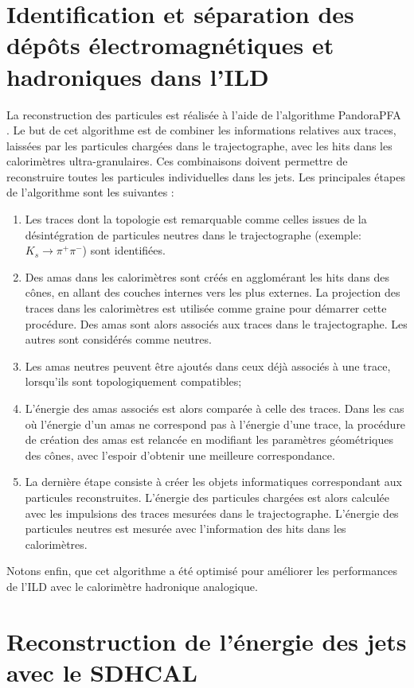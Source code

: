 \newpage
\section{Identification et séparation des dépôts électromagnétiques et hadroniques dans l'ILD}
\label{sec.pandora}
La reconstruction des particules est réalisée à l'aide de l'algorithme PandoraPFA \cite{pfaPandora}. Le but de cet algorithme est de combiner les informations relatives aux traces, laissées par les particules chargées dans le trajectographe, avec les hits dans les calorimètres ultra-granulaires. Ces combinaisons doivent permettre de reconstruire toutes les particules individuelles dans les jets. Les principales étapes de l'algorithme sont les suivantes \cite{pfaPandora}:
\begin{enumerate}[~~1-]
\item Les traces dont la topologie est remarquable comme celles issues de la désintégration de particules neutres dans le trajectographe (exemple: $K_s\rightarrow \pi^+\pi^-$) sont identifiées.
\item Des amas dans les calorimètres sont créés en agglomérant les hits dans des cônes, en allant des couches internes vers les plus externes. La projection des traces dans les calorimètres est utilisée comme graine pour démarrer cette procédure. Des amas sont alors associés aux traces dans le trajectographe. Les autres sont considérés comme neutres.
\item Les amas neutres peuvent être ajoutés dans ceux déjà associés à une trace, lorsqu'ils sont topologiquement compatibles;
\item L'énergie des amas associés est alors comparée à celle des traces. Dans les cas où l'énergie d'un amas ne correspond pas à l'énergie d'une trace, la procédure de création des amas est relancée en modifiant les paramètres géométriques des cônes, avec l'espoir d'obtenir une meilleure correspondance. 
\item La dernière étape consiste à créer les objets informatiques correspondant aux particules reconstruites. L'énergie des particules chargées est alors calculée avec les impulsions des traces mesurées dans le trajectographe. L'énergie des particules neutres est mesurée avec l'information des hits dans les calorimètres.
\end{enumerate}
Notons enfin, que cet algorithme a été optimisé pour améliorer les performances de l'ILD avec le calorimètre hadronique analogique.

\section{Reconstruction de l'énergie des jets avec le SDHCAL}
